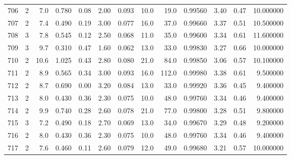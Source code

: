 \begin{tabular}{lrrrrrrrrrrrr}
706  &        2 &            7.0 &             0.780 &         0.08 &            2.00 &      0.093 &                 10.0 &                  19.0 &  0.99560 &  3.40 &       0.47 &  10.000000 \\
707  &        2 &            7.4 &             0.490 &         0.19 &            3.00 &      0.077 &                 16.0 &                  37.0 &  0.99660 &  3.37 &       0.51 &  10.500000 \\
708  &        3 &            7.8 &             0.545 &         0.12 &            2.50 &      0.068 &                 11.0 &                  35.0 &  0.99600 &  3.34 &       0.61 &  11.600000 \\
709  &        3 &            9.7 &             0.310 &         0.47 &            1.60 &      0.062 &                 13.0 &                  33.0 &  0.99830 &  3.27 &       0.66 &  10.000000 \\
710  &        2 &           10.6 &             1.025 &         0.43 &            2.80 &      0.080 &                 21.0 &                  84.0 &  0.99850 &  3.06 &       0.57 &  10.100000 \\
711  &        2 &            8.9 &             0.565 &         0.34 &            3.00 &      0.093 &                 16.0 &                 112.0 &  0.99980 &  3.38 &       0.61 &   9.500000 \\
712  &        2 &            8.7 &             0.690 &         0.00 &            3.20 &      0.084 &                 13.0 &                  33.0 &  0.99920 &  3.36 &       0.45 &   9.400000 \\
713  &        2 &            8.0 &             0.430 &         0.36 &            2.30 &      0.075 &                 10.0 &                  48.0 &  0.99760 &  3.34 &       0.46 &   9.400000 \\
714  &        2 &            9.9 &             0.740 &         0.28 &            2.60 &      0.078 &                 21.0 &                  77.0 &  0.99800 &  3.28 &       0.51 &   9.800000 \\
715  &        3 &            7.2 &             0.490 &         0.18 &            2.70 &      0.069 &                 13.0 &                  34.0 &  0.99670 &  3.29 &       0.48 &   9.200000 \\
716  &        2 &            8.0 &             0.430 &         0.36 &            2.30 &      0.075 &                 10.0 &                  48.0 &  0.99760 &  3.34 &       0.46 &   9.400000 \\
717  &        2 &            7.6 &             0.460 &         0.11 &            2.60 &      0.079 &                 12.0 &                  49.0 &  0.99680 &  3.21 &       0.57 &  10.000000 \\

\end{tabular}
